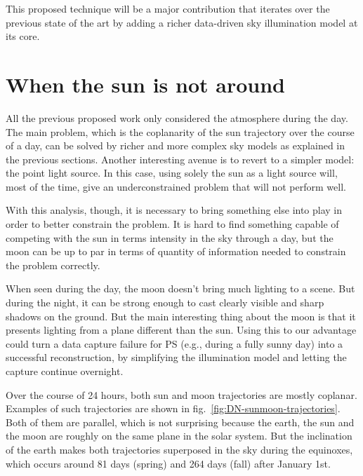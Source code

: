 This proposed technique will be a major contribution that iterates over the previous state of the art by adding a richer data-driven sky illumination model at its core.


\section{When the sun is not around}

All the previous proposed work only considered the atmosphere during the day. The main problem, which is the coplanarity of the sun trajectory over the course of a day, can be solved by richer and more complex sky models as explained in the previous sections. Another interesting avenue is to revert to a simpler model: the point light source. In this case, using solely the sun as a light source will, most of the time, give an underconstrained problem that will not perform well.

With this analysis, though, it is necessary to bring something else into play in order to better constrain the problem. It is hard to find something capable of competing with the sun in terms intensity in the sky through a day, but the moon can be up to par in terms of quantity of information needed to constrain the problem correctly.


When seen during the day, the moon doesn't bring much lighting to a scene. But during the night, it can be strong enough to cast clearly visible and sharp shadows on the ground. But the main interesting thing about the moon is that it presents lighting from a plane different than the sun. Using this to our advantage could turn a data capture failure for PS (e.g., during a fully sunny day) into a successful reconstruction, by simplifying the illumination model and letting the capture continue overnight.

Over the course of 24 hours, both sun and moon trajectories are mostly coplanar. Examples of such trajectories are shown in fig.~\ref{fig:DN-sunmoon-trajectories}. Both of them are parallel, which is not surprising because the earth, the sun and the moon are roughly on the same plane in the solar system. But the inclination of the earth makes both trajectories superposed in the sky during the equinoxes, which occurs around 81 days (spring) and 264 days (fall) after January 1st.

